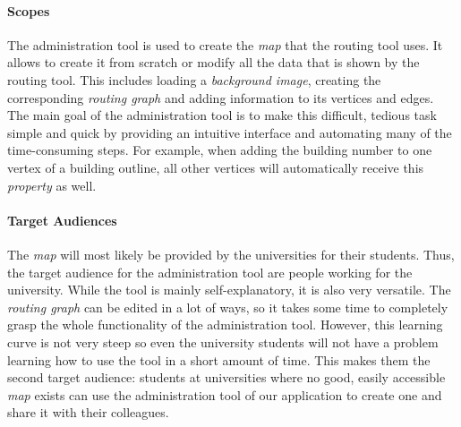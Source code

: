 \paragraph{Scopes}
The administration tool is used to create the \textit{map} that the routing tool uses. It allows to create it from scratch or modify all the data that is
shown by the routing tool. This includes loading a \textit{background image}, creating the corresponding \textit{routing graph} and adding information to its vertices and edges.
The main goal of the administration tool is to make this difficult, tedious task simple and quick by providing an intuitive interface and automating
many of the time-consuming steps. For example, when adding the building number to one vertex of a building outline, all other vertices will automatically
receive this \textit{property} as well.

\paragraph{Target Audiences}
The \textit{map} will most likely be provided by the universities for their students. Thus, the target audience for the administration tool are people
working for the university. While the tool is mainly self-explanatory, it is also very versatile. The \textit{routing graph} can be edited in a lot of ways, so it
takes some time to completely grasp the whole functionality of the administration tool. However, this learning curve is not very steep so even the
university students will not have a problem learning how to use the tool in a short amount of time. This makes them the second target audience:
students at universities where no good, easily accessible \textit{map} exists can use the administration tool of our application to create one and share it
with their colleagues.
